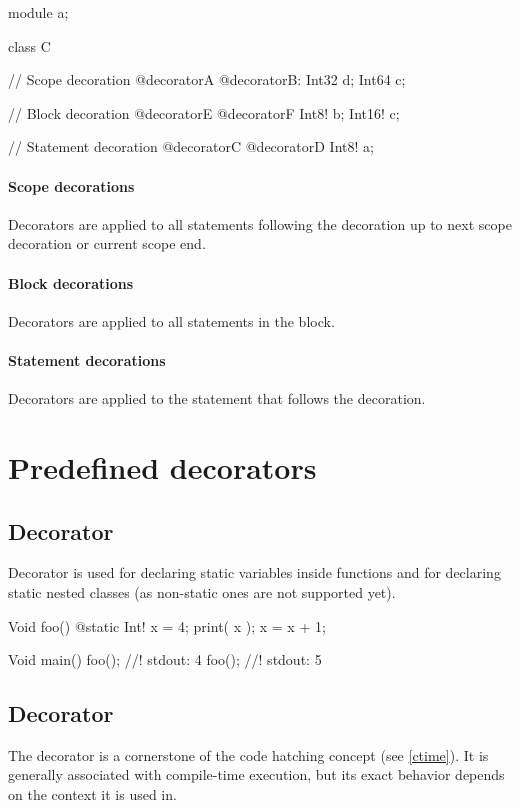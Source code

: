 \begin{code}
module a;

class C {
	
// Scope decoration
@decoratorA @decoratorB:
	Int32 d;
	Int64 c;
	
	// Block decoration
	@decoratorE @decoratorF {
		Int8! b;
		Int16! c;	
	}
	
	// Statement decoration
	@decoratorC @decoratorD Int8! a;
				
}
\end{code}

\paragraph{Scope decorations} Decorators are applied to all statements following the decoration up to next scope decoration or current scope end.

\paragraph{Block decorations} Decorators are applied to all statements in the block.

\paragraph{Statement decorations} Decorators are applied to the statement that follows the decoration.

\section{Predefined decorators}

\subsection{Decorator } \label{decorator:static}
Decorator  is used for declaring static variables inside functions and for declaring static nested classes (as non-static ones are not supported yet). \nopagebreak

\begin{code}
Void foo() {
	@static Int! x = 4;
	print( x );
	x = x + 1;
}

Void main() {
	foo(); //! stdout: 4
	foo(); //! stdout: 5
}
\end{code}

\subsection{Decorator \ctime} \label{decorator:ctime}
The \ctime decorator is a cornerstone of the code hatching concept (see \autoref{ctime}). It is generally associated with compile-time execution, but its exact behavior depends on the context it is used in.

